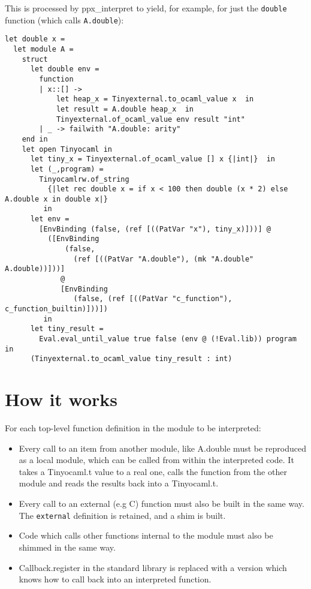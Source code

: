 \documentclass[10pt]{article}
\begin{document}
\noindent This is processed by \textsf{ppx\_interpret} to yield, for example, for just the \texttt{double} function (which calls \texttt{A.double}):

{\small\begin{verbatim}
let double x =
  let module A =
    struct
      let double env =
        function
        | x::[] ->
            let heap_x = Tinyexternal.to_ocaml_value x  in
            let result = A.double heap_x  in
            Tinyexternal.of_ocaml_value env result "int"
        | _ -> failwith "A.double: arity" 
    end in
    let open Tinyocaml in
      let tiny_x = Tinyexternal.of_ocaml_value [] x {|int|}  in
      let (_,program) =
        Tinyocamlrw.of_string
          {|let rec double x = if x < 100 then double (x * 2) else A.double x in double x|}
         in
      let env =
        [EnvBinding (false, (ref [((PatVar "x"), tiny_x)]))] @
          ([EnvBinding
              (false,
                (ref [((PatVar "A.double"), (mk "A.double" A.double))]))]
             @
             [EnvBinding
                (false, (ref [((PatVar "c_function"), c_function_builtin)]))])
         in
      let tiny_result =
        Eval.eval_until_value true false (env @ (!Eval.lib)) program  in
      (Tinyexternal.to_ocaml_value tiny_result : int)
\end{verbatim}}

\section*{How it works}

For each top-level function definition in the module to be interpreted:

\begin{itemize}
\item Every call to an item from another module, like A.double must be reproduced as a local module, which can be called from within the interpreted code. It takes a Tinyocaml.t value to a real one, calls the function from the other module and reads the results back into a Tinyocaml.t.
\item Every call to an external (e.g C) function must also be built in the same way. The \texttt{external} definition is retained, and a shim is built.
\item Code which calls other functions internal to the module must also be shimmed in the same way.
\item Callback.register in the standard library is replaced with a version which knows how to call back into an interpreted function.
\end{itemize}
\end{document}
